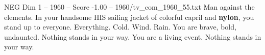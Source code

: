 \begin{textsample}{NEG Dim 1 – 1960 – Score -1.00 – 1960/tv\_com\_1960\_55.txt}  \label{ex:f1_neg_071}
Man against the elements.
In your handsome HIS sailing jacket of colorful capril and \textbf{nylon}, you stand up to everyone.
Everything.
Cold.
Wind.
Rain.
You are brave, bold, undaunted.
Nothing stands in your way.
You are a living event.
Nothing stands in your way.

\end{textsample}
